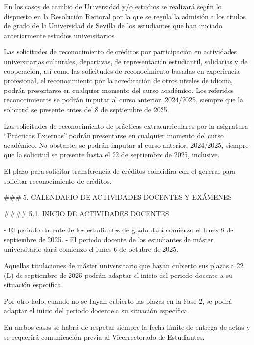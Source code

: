\documentclass{article}
\begin{document}
\begin{itemize}
\begin{itemize}
\begin{scriptsize}
                  En los casos de cambio de Universidad y/o estudios se realizará según lo dispuesto en la Resolución Rectoral por la que se regula la admisión a los títulos de grado de la Universidad de Sevilla de los estudiantes que han iniciado anteriormente estudios universitarios.

                  Las solicitudes de reconocimiento de créditos por participación en actividades universitarias culturales, deportivas, de representación estudiantil, solidarias y de cooperación, así como las solicitudes de reconocimiento basadas en experiencia profesional, el reconocimiento por la acreditación de otros niveles de idioma, podrán presentarse en cualquier momento del curso académico. Los referidos reconocimientos se podrán imputar al curso anterior, 2024/2025, siempre que la solicitud se presente antes del 8 de septiembre de 2025.

                  Las solicitudes de reconocimiento de prácticas extracurriculares por la asignatura “Prácticas Externas” podrán presentarse en cualquier momento del curso académico. No obstante, se podrán imputar al curso anterior, 2024/2025, siempre que la solicitud se presente hasta el 22 de septiembre de 2025, inclusive.

                  El plazo para solicitar transferencia de créditos coincidirá con el general para solicitar reconocimiento de créditos.

                  \#\#\# 5. CALENDARIO DE ACTIVIDADES DOCENTES Y EXÁMENES

                  \#\#\#\# 5.1. INICIO DE ACTIVIDADES DOCENTES

                  - El periodo docente de los estudiantes de grado dará comienzo el lunes 8 de septiembre de 2025.
                  - El periodo docente de los estudiantes de máster universitario dará comienzo el lunes 6 de octubre de 2025.

                  Aquellas titulaciones de máster universitario que hayan cubierto sus plazas a 22 (L) de septiembre de 2025 podrán adaptar el inicio del periodo docente a su situación específica.

                  Por otro lado, cuando no se hayan cubierto las plazas en la Fase 2, se podrá adaptar el inicio del periodo docente a su situación específica.

                  En ambos casos se habrá de respetar siempre la fecha límite de entrega de actas y se requerirá comunicación previa al Vicerrectorado de Estudiantes.


\end{scriptsize}
\end{itemize}
\end{itemize}
\end{document}
